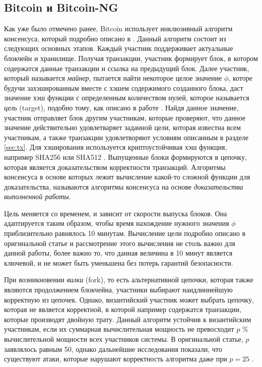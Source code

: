 \subsection{Bitcoin и Bitcoin-NG}
Как уже было отмечено ранее, Bitcoin использует инклюзивный алгоритм консенсуса, который подробно описано в \cite{nakamoto}. Данный алгоритм состоит из следующих основных этапов.
Каждый участник поддерживает актуальные блокчейн и хранилище. Получая транзакции, участник формирует блок, в котором содержатся данные транзакции и ссылка на предыдущий блок. Далее участник, который называется \textit{майнер}, пытается найти некоторое целое значение $\phi$, которе будучи захэшированным вместе с хэшем содержимого созданного блока, даст значение хэш функции с определенным количеством нулей, которое называется \textit{цель} (target), подобно тому, как описано в работе \cite{hashcash}. Найдя данное значение, участник отправляет блок другим участникам, которые проверяют, что данное значение действительно удовлетваряет заданной цели, которая известна всем участникам, а также транзакции удовлетворяют условиям описанным в разделе \ref{sec:tx}. Для хэширования используется криптоустойчивая хэш функция, например SHA256 или SHA512 \cite{sha-2}.
Выпущенные блоки формируются в цепочку, которая является доказательством корректности транзакций. Алгоритмы консенсуса в основе которых лежит вычисление какой-то сложной функции для доказательства, называются  алгоритмы консенсуса на основе \textit{доказательства выполненной работы}\cite{pow}.

Цель меняется со временем, и зависит от скорости выпуска блоков. Она адаптируется таким образом, чтобы время нахождение нужного значения $\phi$  приблизительно равнялось 10 минутам. Вычисление цели подробно описано в оригинальной статье \cite{nakamoto} и рассмотрение этого вычисления не столь важно для данной работы, более важно то, что данная величина в 10 минут является ключевой, и не может быть уменьшена без потерь гарантий безопасности.

При возникновении \textit{вилки} (fork), то есть альтернативной цепочки, которая также являются продолжением блокчейна, участники выбирают наидлиннейшую корректную из цепочек. Однако, византийский участник может выбрать цепочку, которая не является корректной, в которой например содержатся транзакции, которые производят двойную трату. Данный алгоритм устойчив к византийским участникам, если их суммарная вычислительная мощность не превосходит $p$ \% вычислительной мощности всех участников системы. В оригинальной статье, $p$ заявлялось равным 50, однако дальнейшие исследования показали, что существуют атаки, которые нарушают корректность алгоритма даже при $p=25$ \cite{DBLP:journals/corr/EyalS13}.

